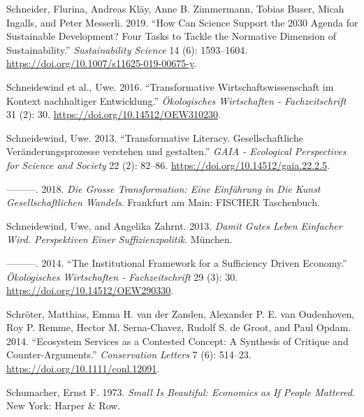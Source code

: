 \documentclass[
  a4paper,
  openany]{book}
\newlength{\cslhangindent}
\newenvironment{CSLReferences}[2] %
 {\begin{list}{}{%
  \setlength{\itemindent}{0pt}
  \setlength{\leftmargin}{0pt}
  \setlength{\parsep}{0pt}
  \ifodd #1
   \setlength{\leftmargin}{\cslhangindent}
   \setlength{\itemindent}{-1\cslhangindent}
  \fi
  \setlength{\itemsep}{#2\baselineskip}}}
 {\end{list}}
\begin{document}
\begin{CSLReferences}{1}{0}
Schneider, Flurina, Andreas Kläy, Anne B. Zimmermann, Tobias Buser,
Micah Ingalls, and Peter Messerli. 2019. {``How Can Science Support the
2030 {Agenda} for {Sustainable Development}? {Four} Tasks to Tackle the
Normative Dimension of Sustainability.''} \emph{Sustainability Science}
14 (6): 1593--1604. \url{https://doi.org/10.1007/s11625-019-00675-y}.

Schneidewind et al., Uwe. 2016. {``{Transformative
Wirtschaftswissenschaft im Kontext nachhaltiger Entwicklung}.''}
\emph{{Ö}kologisches Wirtschaften - Fachzeitschrift} 31 (2): 30.
\url{https://doi.org/10.14512/OEW310230}.

Schneidewind, Uwe. 2013. {``{Transformative Literacy. Gesellschaftliche
Ver{ä}nderungsprozesse verstehen und gestalten}.''} \emph{GAIA -
Ecological Perspectives for Science and Society} 22 (2): 82--86.
\url{https://doi.org/10.14512/gaia.22.2.5}.

---------. 2018. \emph{Die {Grosse Transformation}: {Eine Einf{ü}hrung}
in Die {Kunst} Gesellschaftlichen {Wandels}}. Frankfurt am Main: FISCHER
Taschenbuch.

Schneidewind, Uwe, and Angelika Zahrnt. 2013. \emph{Damit Gutes {Leben}
Einfacher Wird. {Perspektiven} Einer {Suffizienzpolitik}}. München.

---------. 2014. {``The Institutional Framework for a Sufficiency Driven
Economy.''} \emph{Ökologisches Wirtschaften - Fachzeitschrift} 29 (3):
30. \url{https://doi.org/10.14512/OEW290330}.

Schröter, Matthias, Emma H. van der Zanden, Alexander P. E. van
Oudenhoven, Roy P. Remme, Hector M. Serna-Chavez, Rudolf S. de Groot,
and Paul Opdam. 2014. {``Ecosystem {Services} as a {Contested Concept}:
A {Synthesis} of {Critique} and {Counter-Arguments}.''}
\emph{Conservation Letters} 7 (6): 514--23.
\url{https://doi.org/10.1111/conl.12091}.

Schumacher, Ernst F. 1973. \emph{Small Is {Beautiful}: {Economics} as If
{People Mattered}}. New York: Harper \& Row.


\end{CSLReferences}
\end{document}
